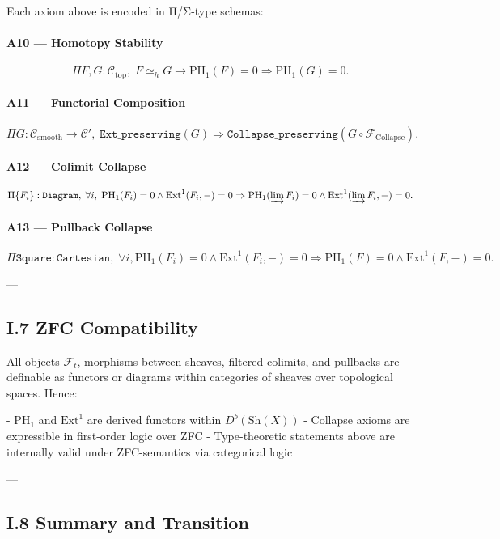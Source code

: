 \documentclass[11pt]{article}
\begin{document}
Each axiom above is encoded in Π/Σ-type schemas:

\paragraph{A10 — Homotopy Stability}
\[
\Pi F, G : \mathcal{C}_{\mathrm{top}}, \; F \simeq_h G \to \mathrm{PH}_1(F) = 0 \Rightarrow \mathrm{PH}_1(G) = 0.
\]

\paragraph{A11 — Functorial Composition}
\[
\Pi G : \mathcal{C}_{\mathrm{smooth}} \to \mathcal{C}', \;
\texttt{Ext\_preserving}(G) \Rightarrow \texttt{Collapse\_preserving}(G \circ \mathcal{F}_{\mathrm{Collapse}}).
\]

\paragraph{A12 — Colimit Collapse}
\[
\Pi \{F_i\} : \texttt{Diagram},\;
\forall i, \; \mathrm{PH}_1(F_i) = 0 \wedge \mathrm{Ext}^1(F_i,-) = 0
\Rightarrow \mathrm{PH}_1(\varinjlim F_i) = 0 \wedge \mathrm{Ext}^1(\varinjlim F_i,-) = 0.
\]

\paragraph{A13 — Pullback Collapse}
\[
\Pi \texttt{Square} : \texttt{Cartesian},\;
\forall i, \mathrm{PH}_1(F_i) = 0 \wedge \mathrm{Ext}^1(F_i, -) = 0 \Rightarrow \mathrm{PH}_1(F) = 0 \wedge \mathrm{Ext}^1(F, -) = 0.
\]

---

\subsection*{I.7 ZFC Compatibility}

All objects $\mathcal{F}_t$, morphisms between sheaves, filtered colimits, and pullbacks are definable as functors or diagrams within categories of sheaves over topological spaces. Hence:

- $\mathrm{PH}_1$ and $\mathrm{Ext}^1$ are derived functors within $D^b(\text{Sh}(X))$
- Collapse axioms are expressible in first-order logic over ZFC
- Type-theoretic statements above are internally valid under ZFC-semantics via categorical logic

---

\subsection*{I.8 Summary and Transition}
\end{document}
